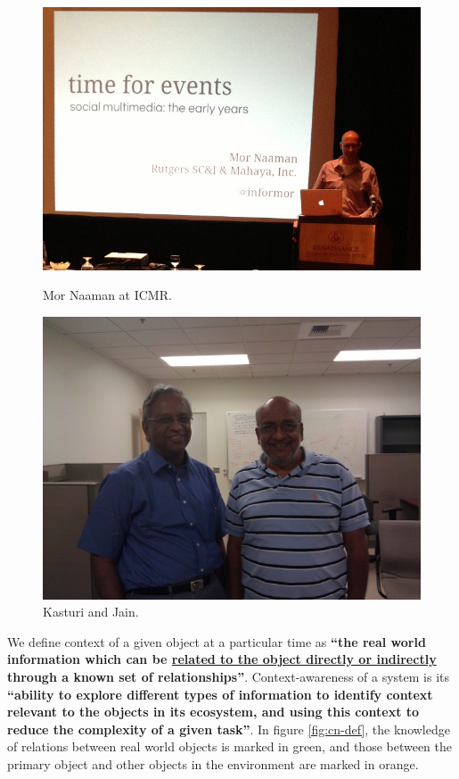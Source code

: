 \begin{figure}[t]
\begin{minipage}[b]{0.48\linewidth}
\centering
\includegraphics[width=\textwidth]{media/chapter2/naaman.jpg}
\caption{Mor Naaman at ICMR.}
\label{fig:naaman-icmr}
\end{minipage}
\hspace{0.5cm}
\begin{minipage}[b]{0.45\linewidth}
\centering
\includegraphics[width=\textwidth]{media/chapter1/kasturi-show.jpg}
\caption{Kasturi and Jain.}
\label{fig:example-kasturi-show}
\end{minipage}
\end{figure}

We define context of a given object at a particular time as \textbf{``the real world information which can be \uline{related to the object directly or indirectly} through a known set of relationships''}. Context-awareness of a system is its \textbf{``ability to explore different types of information to identify context relevant to the objects in its ecosystem, and using this context to reduce the complexity of a given task''}. In figure \ref{fig:cn-def}, the knowledge of relations between real world objects is marked in green, and those between the primary object and other objects in the environment are marked in orange.

